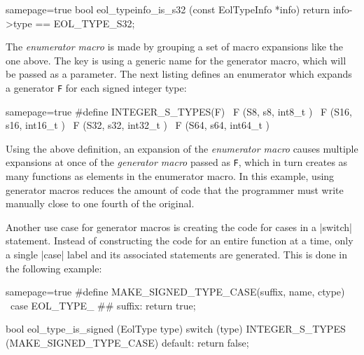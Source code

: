 \begin{ccode*}{samepage=true}
  bool eol_typeinfo_is_s32 (const EolTypeInfo *info)
  { return info->type == EOL_TYPE_S32; }
\end{ccode*}

\noindent The \emph{enumerator macro} is made by grouping a set of macro
expansions like the one above. The key is using a generic name for the
generator macro, which will be passed as a parameter. The next listing defines
an enumerator which expands a generator \verb|F| for each signed integer type:

\begin{ccode*}{samepage=true}
#define INTEGER_S_TYPES(F) \
    F (S8,  s8,  int8_t  ) \
    F (S16, s16, int16_t ) \
    F (S32, s32, int32_t ) \
    F (S64, s64, int64_t )
\end{ccode*}

\noindent Using the above definition, an expansion of the \emph{enumerator
macro} causes multiple expansions at once of the \emph{generator macro} passed
as \verb|F|, which in turn creates as many functions as elements in the
enumerator macro. In this example, using generator macros reduces the amount
of code that the programmer must write manually close to one fourth of the
original.

Another use case for generator macros is creating the code for cases in
a \Mc|switch| statement. Instead of constructing the code for an entire
function at a time, only a single \Mc|case| label and its associated
statements are generated. This is done in the following example:

\begin{ccode*}{samepage=true}
#define MAKE_SIGNED_TYPE_CASE(suffix, name, ctype) \
    case EOL_TYPE_ ## suffix: return true;

bool eol_type_is_signed (EolType type) {
  switch (type) {
    INTEGER_S_TYPES (MAKE_SIGNED_TYPE_CASE)
    default: return false;
  }
}
\end{ccode*}


\beforeintro
